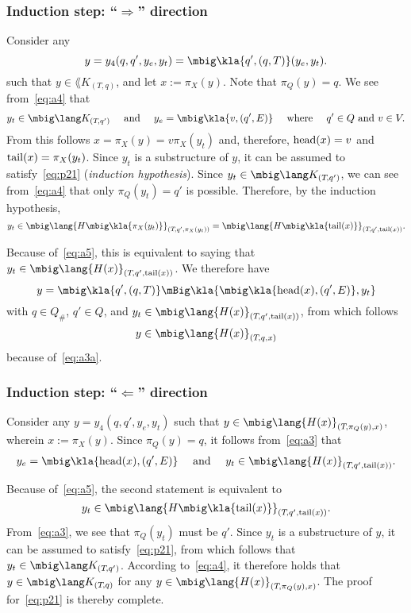 \subsubsection*{Induction step: ``$\Rightarrow$'' direction}

Consider any
\[
 y = y_4(q,q',y_e,y_t) = \mbig\kla{q',(q,T)}(y_e,y_t).
\]
such that $y\in\lang K_{(T,q)}$, and let $x:=\pi_X(y)$. Note that $\pi_Q(y) =
q$.  We see from~\eqref{eq:a4} that
\[
 y_t \in \mbig\lang K_{(T\!,q')}
 \quad\text{ and }\quad
 y_e = \mbig\kla{v,(q',E)}
 \quad\text{ where }\quad
 q'\in Q \text{ and } v\in V.
\]
From this follows $x = \pi_X(y) = v\pi_X(y_t)$ and, therefore, $\operatorname{head}(x) = v$
and $\operatorname{tail}(x)=\pi_X(y_t)$. Since $y_t$ is a substructure of $y$, it can be
assumed to satisfy~\eqref{eq:p21} (\emph{induction hypothesis}). Since
$y_t\in\mbig\lang K_{(T\!,q')}$, we can see from~\eqref{eq:a4} that only
$\pi_Q(y_t) = q'$ is possible. Therefore, by the induction hypothesis,
\[
 y_t
 \in \mbig\lang{H\mbig\kla{\pi_X(y_t)}}_{(T\!,q',\pi_X(y_t))}
 = \mbig\lang{H\mbig\kla{\cdr(x)}}_{(T\!,q',\cdr(x))}.
\]

Because of~\eqref{eq:a5}, this is equivalent to saying that $y_t \in \mbig\lang{H(x)}_{(T\!,q',\cdr(x))}$. We therefore have
\[
 y = \mbig\kla{q',(q,T)}\mBig\kla{\mbig\kla{\car(x),(q',E)},y_t}
\]
with $q\in Q_\#$, $q'\in Q$, and $y_t \in \mbig\lang{H(x)}_{(T\!,q',\cdr(x))}$,
from which follows
\[
 y \in \mbig\lang{H(x)}_{(T\!,q,x)}
\]
because of~\eqref{eq:a3a}.

\subsubsection*{Induction step: ``$\Leftarrow$'' direction}

Consider any $y = y_4(q,q',y_e,y_t)$ such that
$y\in\mbig\lang{H(x)}_{(T\!,\pi_Q(y),x)}$, wherein $x := \pi_X(y)$. Since
$\pi_Q(y) = q$, it follows from~\eqref{eq:a3} that
\[
 y_e = \mbig\kla{\car(x),(q',E)}
 \quad\text{ and }\quad
 y_t \in \mbig\lang{H(x)}_{(T\!,q',\cdr(x))}.
\]

Because of~\eqref{eq:a5}, the second statement is equivalent to
\[
 y_t \in \mbig\lang{H\mbig\kla{\cdr(x)}}_{(T\!,q',\cdr(x))}.
\]
From~\eqref{eq:a3}, we see that $\pi_Q(y_t)$ must be $q'$. Since $y_t$ is a
substructure of $y$, it can be assumed to satisfy~\eqref{eq:p21}, from which
follows that $y_t \in \mbig\lang K_{(T\!,q')}$. According to~\eqref{eq:a4}, it
therefore holds that $y\in\mbig\lang K_{(T\!,q)}$ for any
$y\in\mbig\lang{H(x)}_{(T\!,\pi_Q(y),x)}$. The proof for~\eqref{eq:p21} is
thereby complete.

